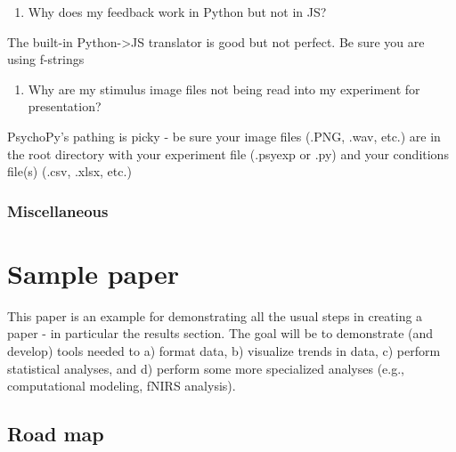 \documentclass[
]{book}
\providecommand{\tightlist}{%
  \setlength{\itemsep}{0pt}\setlength{\parskip}{0pt}}
\begin{document}
\begin{enumerate}
\def\labelenumi{(\arabic{enumi})}
\setcounter{enumi}{3}
\tightlist
\item
  Why does my feedback work in Python but not in JS?
\end{enumerate}

The built-in Python-\textgreater JS translator is good but not perfect. Be sure you are using f-strings

\begin{enumerate}
\def\labelenumi{(\arabic{enumi})}
\setcounter{enumi}{4}
\tightlist
\item
  Why are my stimulus image files not being read into my experiment for presentation?
\end{enumerate}

PsychoPy's pathing is picky - be sure your image files (.PNG, .wav, etc.) are in the root directory with your experiment file (.psyexp or .py) and your conditions file(s) (.csv, .xlsx, etc.)

\hypertarget{miscellaneous}{%
\subsection{Miscellaneous}\label{miscellaneous}}

\hypertarget{sample_paper}{%
\chapter{Sample paper}\label{sample_paper}}

This paper is an example for demonstrating all the usual steps in creating a paper - in particular the results section. The goal will be to demonstrate (and develop) tools needed to a) format data, b) visualize trends in data, c) perform statistical analyses, and d) perform some more specialized analyses (e.g., computational modeling, fNIRS analysis).

\hypertarget{road-map}{%
\section{Road map}\label{road-map}}
\end{document}
